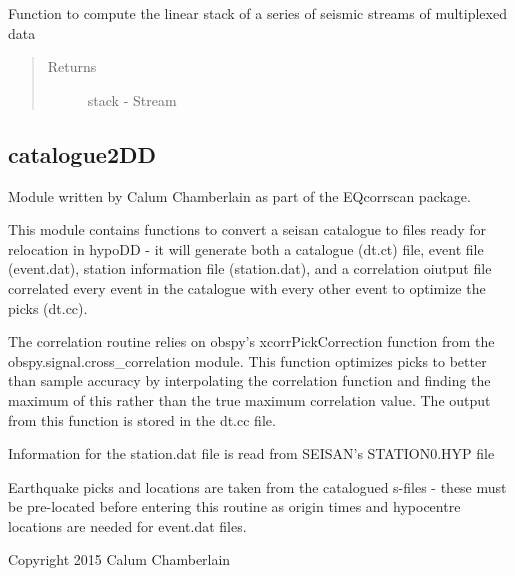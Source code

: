 \documentclass[a4paper,10pt,english]{sphinxmanual}
\begin{document}

\begin{fulllineitems}
\label{utils:stacking.linstack}
Function to compute the linear stack of a series of seismic streams of
multiplexed data
\begin{quote}\begin{description}
\item[{Returns}] \leavevmode
stack - Stream

\end{description}\end{quote}

\end{fulllineitems}



\subsection{catalogue2DD}
\label{utils:module-catalogue2DD}\label{utils:catalogue2dd}
Module written by Calum Chamberlain as part of the EQcorrscan package.

This module contains functions to convert a seisan catalogue to files ready for
relocation in hypoDD - it will generate both a catalogue (dt.ct) file, event
file (event.dat), station information file (station.dat), and a correlation
oiutput file correlated every event in the catalogue with every other event to
optimize the picks (dt.cc).

The correlation routine relies on obspy's xcorrPickCorrection function from the
obspy.signal.cross\_correlation module.  This function optimizes picks to better
than sample accuracy by interpolating the correlation function and finding the
maximum of this rather than the true maximum correlation value.  The output
from this function is stored in the dt.cc file.

Information for the station.dat file is read from SEISAN's STATION0.HYP file

Earthquake picks and locations are taken from the catalogued s-files - these
must be pre-located before entering this routine as origin times and hypocentre
locations are needed for event.dat files.

Copyright 2015 Calum Chamberlain
\end{document}
